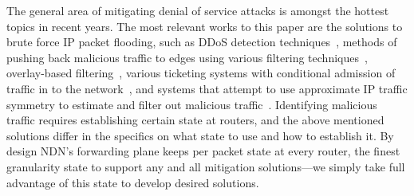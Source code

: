 \documentclass[10pt,conference]{IEEEtran}
\begin{document}
{The general area of mitigating denial of service attacks is amongst the hottest topics in recent years.
The most relevant works to this paper are the solutions to brute force IP packet flooding, such as DDoS detection techniques~\cite{Chen:2007:Collaborative-detection, Jun:2011:DDoS-flooding}, methods of pushing back malicious traffic to edges using various filtering techniques~\cite{Pushback, Tupakula:2003:A-practical-method, Argyraki:2005:Active-internet, Oikonomou:2006:A-framework-for-a-collaborative, Liu:2008:To-filter-or-to-authorize:, Chou:2009:Proactive-surge, Liu:2010:NetFence:-preventing}, 
overlay-based filtering~\cite{Stone:2000:CenterTrack:-An-IP-overlay, Keromytis:2004:SOS:-An-architecture, Kline:2011:Shield:-DoS-filtering}, 
various ticketing systems with conditional admission of traffic in to the network~\cite{Yaar:2004:SIFF:-A-stateless, Yang:2005:A-DoS-limiting-network, Wendlandt:2006:Fastpass:-Providing, Natu:2007:Fine-grained-capabilities, Portcullis, Capabilities},
and systems that attempt to use approximate IP traffic symmetry to estimate and filter out malicious traffic~\cite{Wang:2002:Detecting-SYN-flooding, Kreibich:2005:Using-packet, Mahimkar:2007:dFence:-Transparent}. 
Identifying malicious traffic requires establishing certain state at routers, and the above mentioned solutions differ in the specifics on what state to use and how to establish it.  By design NDN's forwarding plane keeps per packet state at every router, the finest granularity state to support any and all mitigation solutions---we simply take full advantage of this state to develop desired solutions.















}
\end{document}
